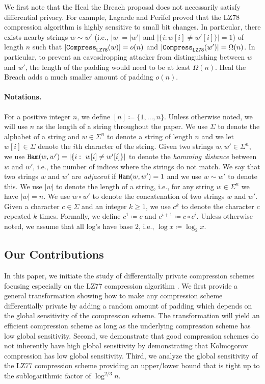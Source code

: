 We first note that the Heal the Breach proposal \cite{palacios2022htb} does not necessarily satisfy differential privacy. For example, Lagarde and Perifel \cite{lagarde2018lempel} proved that the LZ78 compression algorithm \cite{LZ78} is highly sensitive to small bit changes. In particular, there exists nearby strings $w \sim w'$ (i.e., $|w|=|w'|$ and $|\{i:w[i]\neq w'[i]\}|=1$) of length $n$ such that $\left|\mathtt{Compress}_{\sf LZ78}(w) \right| = o(n)$ and $\left|\mathtt{Compress}_{\sf LZ78}(w') \right| = \Omega(n)$. In particular, to prevent an eavesdropping attacker from distinguishing between $w$ and $w'$, the length of the padding would need to be at least $\Omega(n)$. Heal the Breach \cite{palacios2022htb} adds a much smaller amount of padding $o(n)$.

\paragraph*{Notations.}
For a positive integer $n$, we define $[n]\coloneqq\{1,\ldots,n\}$. Unless otherwise noted, we will use $n$ as the length of a string throughout the paper. We use $\Sigma$ to denote the alphabet of a string and $w \in \Sigma^n$ to denote a string of length $n$ and we let $w[i] \in \Sigma$ denote the $i$th character of the string. Given two strings $w,w' \in \Sigma^n$, we use $\mathtt{Ham}(w,w') = \left| \{ i:~w[i] \neq w'[i]\} \right|$ to denote the \emph{hamming distance} between $w$ and $w'$, i.e., the number of indices where the strings do not match. We say that two strings $w$ and $w'$ are \emph{adjacent} if $\mathtt{Ham}(w,w')=1$ and we use $w \sim w'$ to denote this. We use $|w|$ to denote the length of a string, i.e., for any string $w \in \Sigma^n$ we have $|w| = n$. We use $w \circ w'$ to denote the concatenation of two strings $w$ and $w'$. Given a character $c \in \Sigma$ and an integer $k \geq 1$, we use $c^k$ to denote the character $c$ repeated $k$ times. Formally, we define $c^1 \coloneqq c$ and $c^{i+1} \coloneqq c \circ c^i$. Unless otherwise noted, we assume that all log's have base $2$, i.e., $\log x \coloneqq \log_2 x$.

\subsection{Our Contributions}
In this paper, we initiate the study of differentially private compression schemes focusing especially on the  LZ77 compression algorithm \cite{LZ77}. We first provide a general transformation showing how to make any compression scheme differentially private by adding a random amount of padding which depends on the global sensitivity of the compression scheme. The transformation will yield an efficient compression scheme as long as the underlying compression scheme has low global sensitivity. Second, we demonstrate that good compression schemes do not inherently have high global sensitivity by demonstrating that Kolmogorov compression has low global sensitivity. Third, we analyze the global sensitivity of the LZ77 compression scheme providing an upper/lower bound that is tight up to the sublogarithmic factor of $\log^{2/3} n$. 

